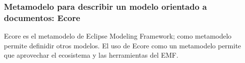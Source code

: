 \subsubsection*{Metamodelo para describir un modelo orientado a documentos: Ecore}
Ecore es el metamodelo de Eclipse Modeling Framework; como metamodelo permite definidir otros modelos. El uso de Ecore como un metamodelo permite que aprovechar el ecosistema y las herramientas del EMF.